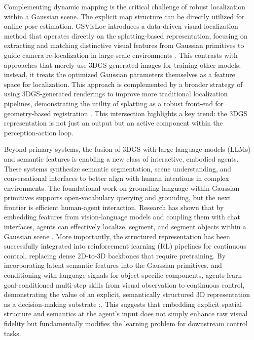 \documentclass[11pt,a4paper]{article}
\begin{document}
Complementing dynamic mapping is the critical challenge of robust localization within a Gaussian scene. The explicit map structure can be directly utilized for online pose estimation. GSVisLoc introduces a data-driven visual localization method that operates directly on the splatting-based representation, focusing on extracting and matching distinctive visual features from Gaussian primitives to guide camera re-localization in large-scale environments \cite{arxiv:2410.07577v2}. This contrasts with approaches that merely use 3DGS-generated images for training other models; instead, it treats the optimized Gaussian parameters themselves as a feature space for localization. This approach is complemented by a broader strategy of using 3DGS-generated renderings to improve more traditional localization pipelines, demonstrating the utility of splatting as a robust front-end for geometry-based registration \cite{arxiv:2404.03613v1}. This intersection highlights a key trend: the 3DGS representation is not just an output but an active component within the perception-action loop.

Beyond primary systems, the fusion of 3DGS with large language models (LLMs) and semantic features is enabling a new class of interactive, embodied agents. These systems synthesize semantic segmentation, scene understanding, and conversational interfaces to better align with human intentions in complex environments. The foundational work on grounding language within Gaussian primitives supports open-vocabulary querying and grounding, but the next frontier is efficient human-agent interaction. Research has shown that by embedding features from vision-language models and coupling them with chat interfaces, agents can effectively localize, segment, and segment objects within a Gaussian scene \cite{arxiv:2506.06822v1}. More importantly, the structured representation has been successfully integrated into reinforcement learning (RL) pipelines for continuous control, replacing dense 2D-to-3D backbones that require pretraining. By incorporating latent semantic features into the Gaussian primitives, and conditioning with language signals for object-specific components, agents learn goal-conditioned multi-step skills from visual observation to continuous control, demonstrating the value of an explicit, semantically structured 3D representation as a decision-making substrate \cite{arxiv:2507.00886v1};\cite{arxiv:2406.02370v3}. This suggests that embedding explicit spatial structure and semantics at the agent's input does not simply enhance raw visual fidelity but fundamentally modifies the learning problem for downstream control tasks.
\end{document}
